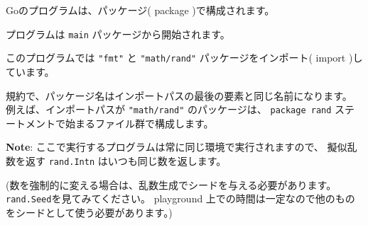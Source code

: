 Goのプログラムは、パッケージ( package )で構成されます。

プログラムは \texttt{main} パッケージから開始されます。

このプログラムでは \texttt{"fmt"} と \texttt{"math/rand"} パッケージをインポート( import )しています。

規約で、パッケージ名はインポートパスの最後の要素と同じ名前になります。
例えば、インポートパスが \texttt{"math/rand"} のパッケージは、
\texttt{package rand} ステートメントで始まるファイル群で構成します。

\textbf{Note}: ここで実行するプログラムは常に同じ環境で実行されますので、
擬似乱数を返す \texttt{rand.Intn} はいつも同じ数を返します。

(数を強制的に変える場合は、乱数生成でシードを与える必要があります。
\texttt{rand.Seed}を見てみてください。
playground 上での時間は一定なので他のものをシードとして使う必要があります。)
